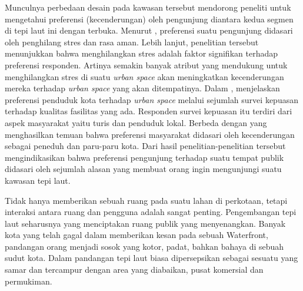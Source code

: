 \documentclass[../projects/thesis.tex]{subfiles}
\begin{document}
Munculnya perbedaan desain pada kawasan tersebut mendorong peneliti untuk mengetahui preferensi (kecenderungan) oleh pengunjung diantara kedua segmen di tepi laut ini dengan terbuka. Menurut \cite{thomas2020}, preferensi suatu pengunjung didasari oleh penghilang stres dan rasa aman. Lebih lanjut, penelitian tersebut menunjukkan bahwa menghilangkan stres adalah faktor signifikan terhadap preferensi responden. Artinya semakin banyak atribut yang mendukung untuk menghilangkan stres di suatu \textit{urban space} akan meningkatkan kecenderungan mereka terhadap \textit{urban space} yang akan ditempatinya.
Dalam \citep{wang2020}, menjelaskan preferensi penduduk kota terhadap \textit{urban space} melalui sejumlah survei kepuasan terhadap kualitas fasilitas yang ada. Responden survei kepuasan itu terdiri dari aspek masyarakat yaitu turis dan penduduk lokal.
Berbeda dengan \cite{imansari2015} yang menghasilkan temuan bahwa preferensi masyarakat didasari oleh kecenderungan sebagai peneduh dan paru-paru kota.
Dari hasil penelitian-penelitian tersebut mengindikasikan bahwa preferensi pengunjung terhadap suatu tempat publik didasari oleh sejumlah alasan yang membuat orang ingin mengunjungi suatu kawasan tepi laut.



\begin{comment}
Menurut \cite{shamsuddin2013}, riverside merupakan ruang perkotaan yang harus terus berkembang. Kawasan inilah yang diberkahi dengan karakteristik dan perhatian khusus mengingat pentingnya air sebagai sumber kehidupan kota.
Pada area laut perkotaan, lomba untuk ruang waterfront, kebutuhan publik untuk mengakses pesisir laut dan mempertahankan biodiversity tepi laut sebagai sumber alami menjadi isu terhangat dalam kebijakan perkotaan \citep{breen1994waterfronts}.
\end{comment}
Tidak hanya memberikan sebuah ruang pada suatu lahan di perkotaan, tetapi interaksi antara ruang dan pengguna adalah sangat penting. Pengembangan tepi laut seharusnya yang menciptakan ruang publik yang menyenangkan. Banyak kota yang telah gagal dalam memberikan kesan pada sebuah Waterfront, pandangan orang menjadi sosok yang kotor, padat, bahkan bahaya di sebuah sudut kota. Dalam pandangan \cite{goodwin1999} tepi laut biasa dipersepsikan sebagai sesuatu yang samar dan tercampur dengan area yang diabaikan, pusat komersial dan permukiman.
\end{document}
